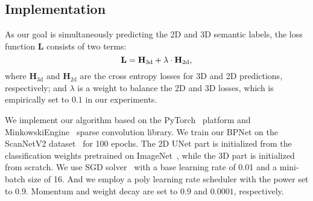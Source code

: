 \documentclass[final]{cvpr}
\begin{document}
\subsection{Implementation}
\vspace{-1mm}
As our goal is simultaneously predicting the 2D and 3D semantic labels, the loss function $\mathbf{L}$ consists of two terms:
\begin{equation}
	\label{loss}
	\mathbf{L} = \mathbf{H}_\text{3d} + \lambda \cdot \mathbf{H}_\text{2d},
	\vspace{-2mm}
\end{equation}
where $\mathbf{H}_\text{3d}$ and $\mathbf{H}_\text{2d}$ are the cross entropy losses for 3D and 2D predictions, respectively; and $\lambda$ is a weight to balance the 2D and 3D losses, which is empirically set to $0.1$ in our experiments.


We implement our algorithm based on the PyTorch~\cite{paszke2019pytorch} platform and MinkowskiEngine~\cite{choy20194d}
sparse convolution library.
We train our BPNet on the ScanNetV2 dataset~\cite{dai2017scannet} for 100 epochs.
The 2D UNet part is initialized from the classification weights pretrained on ImageNet~\cite{deng2009imagenet}, while the 3D part is initialized from scratch.
We use SGD solver~\cite{bottou2010large} with a base learning rate of 0.01 and a mini-batch size of 16. And we employ a poly learning rate scheduler with the power set to $0.9$. Momentum and weight decay are set to $0.9$ and $0.0001$, respectively.
\end{document}
